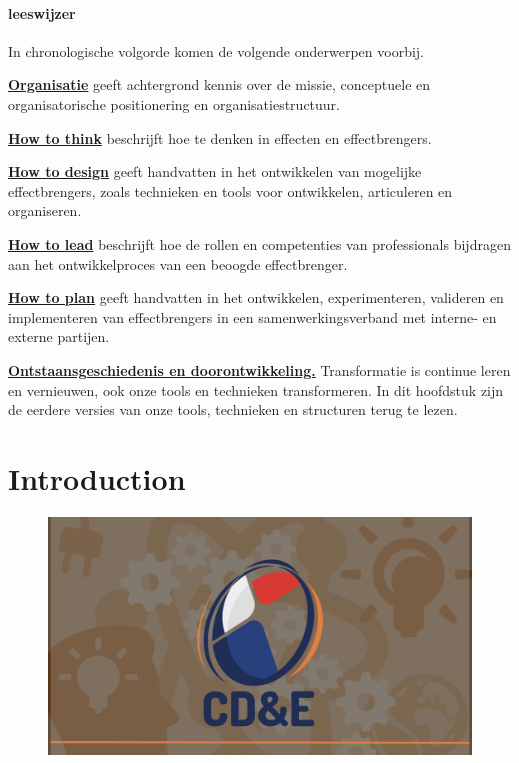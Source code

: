 \documentclass[
]{book}
\begin{document}
\hypertarget{leeswijzer}{%
\subsubsection*{leeswijzer}\label{leeswijzer}}

In chronologische volgorde komen de volgende onderwerpen voorbij.

\textbf{\protect\hyperlink{cde-algemeen}{Organisatie}}
geeft achtergrond kennis over de missie, conceptuele en organisatorische positionering en organisatiestructuur.

\textbf{\protect\hyperlink{how-to-think}{How to think}}
beschrijft hoe te denken in effecten en effectbrengers.

\textbf{\protect\hyperlink{how-to-design}{How to design}}
geeft handvatten in het ontwikkelen van mogelijke effectbrengers, zoals technieken en tools voor ontwikkelen, articuleren en organiseren.

\textbf{\protect\hyperlink{how-to-lead}{How to lead}}
beschrijft hoe de rollen en competenties van professionals bijdragen aan het ontwikkelproces van een beoogde effectbrenger.

\textbf{\protect\hyperlink{how-to-plan}{How to plan}}
geeft handvatten in het ontwikkelen, experimenteren, valideren en implementeren van effectbrengers in een samenwerkingsverband met interne- en externe partijen.

\textbf{\protect\hyperlink{cde-process}{Ontstaansgeschiedenis en doorontwikkeling.}}
Transformatie is continue leren en vernieuwen, ook onze tools en technieken transformeren. In dit hoofdstuk zijn de eerdere versies van onze tools, technieken en structuren terug te lezen.

\hypertarget{intro}{%
\chapter{Introduction}\label{intro}}

\begin{figure}

{\centering \includegraphics[width=0.7\linewidth]{data/keynote-slides/20200430-CDE-Designprocess/20200430-CDE-Designprocess.001} 

}

\caption{ }\label{fig:unnamed-chunk-2}
\end{figure}
\end{document}
